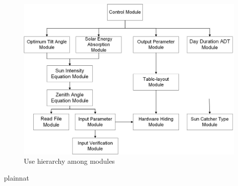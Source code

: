 \documentclass[12pt, titlepage]{article}
\begin{document}
\begin{figure}[H]
	\center
  \includegraphics[scale=0.5]{Fig_Hierarchy.jpg}
 \caption{\label{FigUH} Use hierarchy among modules}
\end{figure}


 {plainnat}

\end{document}
